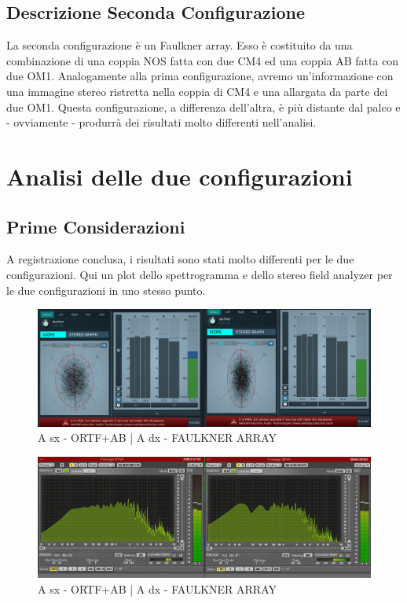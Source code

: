 \documentclass{article}
\begin{document}
    \subsection{Descrizione Seconda Configurazione}    
        La seconda configurazione è un Faulkner array. Esso è costituito da una combinazione di una coppia NOS fatta con due CM4 ed una coppia AB fatta con due OM1. Analogamente alla prima configurazione, avremo un'informazione con una immagine stereo ristretta nella coppia di CM4 e una allargata da parte dei due OM1. Questa configurazione, a differenza dell'altra, è più distante dal palco e - ovviamente - produrrà dei risultati molto differenti nell'analisi.
    \endsubsection
\endsection 

\section{Analisi delle due configurazioni}
    \subsection{Prime Considerazioni}
    A registrazione conclusa, i risultati sono stati molto differenti per le due configurazioni.
    Qui un plot dello spettrogramma e dello stereo field analyzer per le due configurazioni in uno stesso punto.
    
    \begin{figure}[H]
        \centering
        \includegraphics[width=1\textwidth]{images/1PLOT-STEREOSCOPE.png}
         \caption{\label{fig10}A sx - ORTF+AB | A dx - FAULKNER ARRAY}
    \end{figure}
    
    \begin{figure}[H]
        \centering
        \includegraphics[width=1\textwidth]{images/1PLOT-SPAN.png}
         \caption{\label{fig11}A sx - ORTF+AB | A dx - FAULKNER ARRAY}
    \end{figure}
    
\end{document}
